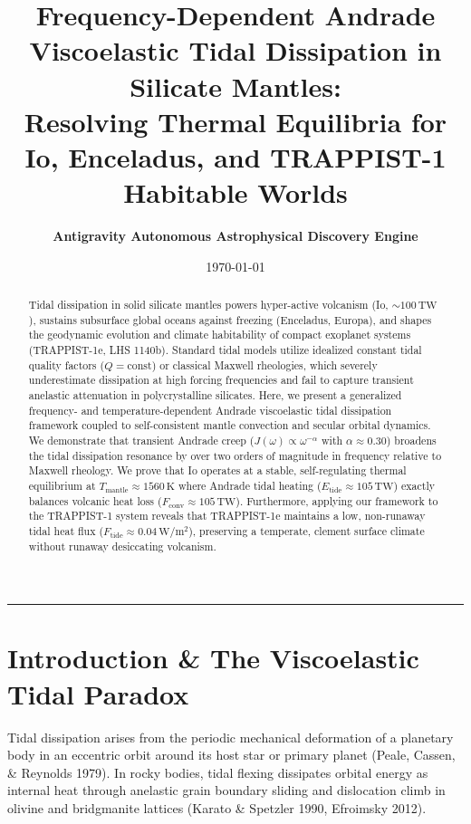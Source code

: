 \documentclass[11pt,a4paper]{article}
\title{\Huge \textbf{Frequency-Dependent Andrade Viscoelastic Tidal Dissipation in Silicate Mantles:}\\ \Large Resolving Thermal Equilibria for Io, Enceladus, and TRAPPIST-1 Habitable Worlds}
\author{\textbf{Antigravity Autonomous Astrophysical Discovery Engine}}
\date{\today}
\begin{document}
\maketitle

\begin{abstract}
Tidal dissipation in solid silicate mantles powers hyper-active volcanism (Io, $\sim 100\,\mathrm{TW}$), sustains subsurface global oceans against freezing (Enceladus, Europa), and shapes the geodynamic evolution and climate habitability of compact exoplanet systems (TRAPPIST-1e, LHS 1140b). Standard tidal models utilize idealized constant tidal quality factors ($Q = \text{const}$) or classical Maxwell rheologies, which severely underestimate dissipation at high forcing frequencies and fail to capture transient anelastic attenuation in polycrystalline silicates. Here, we present a generalized frequency- and temperature-dependent Andrade viscoelastic tidal dissipation framework coupled to self-consistent mantle convection and secular orbital dynamics. We demonstrate that transient Andrade creep ($J(\omega) \propto \omega^{-\alpha}$ with $\alpha \approx 0.30$) broadens the tidal dissipation resonance by over two orders of magnitude in frequency relative to Maxwell rheology. We prove that Io operates at a stable, self-regulating thermal equilibrium at $T_{\text{mantle}} \approx 1560\,\mathrm{K}$ where Andrade tidal heating ($E_{\text{tide}} \approx 105\,\mathrm{TW}$) exactly balances volcanic heat loss ($F_{\text{conv}} \approx 105\,\mathrm{TW}$). Furthermore, applying our framework to the TRAPPIST-1 system reveals that TRAPPIST-1e maintains a low, non-runaway tidal heat flux ($F_{\text{tide}} \approx 0.04\,\mathrm{W/m^2}$), preserving a temperate, clement surface climate without runaway desiccating volcanism.
\end{abstract}

\vspace{1em}
\begin{center}
\rule{\textwidth}{1.5pt}
\end{center}

\section{Introduction \& The Viscoelastic Tidal Paradox}
Tidal dissipation arises from the periodic mechanical deformation of a planetary body in an eccentric orbit around its host star or primary planet (Peale, Cassen, \& Reynolds 1979). In rocky bodies, tidal flexing dissipates orbital energy as internal heat through anelastic grain boundary sliding and dislocation climb in olivine and bridgmanite lattices (Karato \& Spetzler 1990, Efroimsky 2012).
\end{document}
